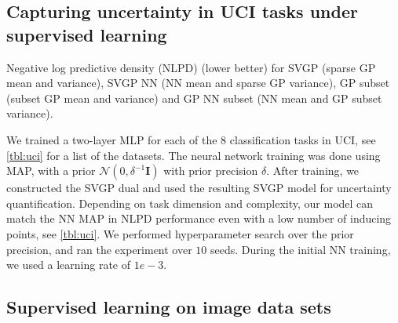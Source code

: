 \documentclass{article}
\newlength{\tblw}
\newcommand{\mbf}[1]{\mathbf{#1}}
\newcommand{\MI}{\mbf{I}}
\begin{document}
\subsection{Capturing uncertainty in UCI tasks under supervised learning}
\label{sec:uci}
%


\begin{table}[t!] 
  \centering\scriptsize
  \caption{Negative log predictive density (NLPD) (lower better) for SVGP (sparse GP mean and variance), SVGP NN (NN mean and sparse GP variance), GP subset (subset GP mean and variance) and GP NN subset (NN mean and GP subset variance). } 
	\label{tbl:uci}
	\renewcommand{\arraystretch}{1.}
	\setlength{\tabcolsep}{2pt}
	\setlength{\tblw}{0.14\textwidth}  
	
	\newcommand{\val}[2]{%
		$#1$\textcolor{gray}{\tiny ${\pm}#2$}
	} 

	
\end{table}
We trained a two-layer MLP for each of the $8$ classification tasks in UCI, see \cref{tbl:uci} for a list of the datasets. The neural network training was done using MAP, with a prior $\mathcal{N}(0,\delta^{-1} \MI)$ with prior precision $\delta$. After training, we constructed the SVGP dual and used the resulting SVGP model for uncertainty quantification. Depending on task dimension and complexity, our model can match the NN MAP in NLPD performance even with a low number of inducing points, see \cref{tbl:uci}. We performed hyperparameter search over the prior precision, and ran the experiment over $10$ seeds. During the initial NN training, we used a learning rate of $1e-3$.



\subsection{Supervised learning on image data sets}
\end{document}
